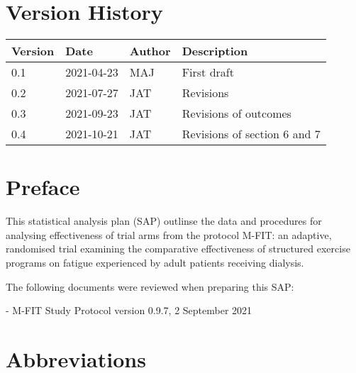 \documentclass[
]{article}
\title{\currentTitle}
\subtitle{}
\author{}
\date{\vspace{-2.5em}\currentVersion}
\begin{document}
\maketitle

{
  \setcounter{tocdepth}{2}
  \tableofcontents
}

\hypertarget{version-history}{%
  \section*{Version History}\label{version-history}}

\begin{table}[H]
  \renewcommand{\arraystretch}{1.5}
  \begin{center}
    \begin{tabular}{lllp{5cm}}
      \hline
      Version & Date       & Author & Description   \\ \hline
      0.1     & 2021-04-23 & MAJ    & First draft   \\
      0.2     & 2021-07-27 & JAT    & Revisions \\
      0.3     & 2021-09-23 & JAT    & Revisions of outcomes \\
      0.4     & 2021-10-21 & JAT    & Revisions of section 6 and 7 \\
      \hline
    \end{tabular}
  \end{center}
\end{table}

\clearpage

\hypertarget{preface}{%
  \section*{Preface}\label{Preface}}

This statistical analysis plan (SAP) outlinse the data and procedures for analysing effectiveness of trial arms from the protocol M-FIT: an adaptive, randomised trial examining the comparative effectiveness of structured exercise programs on fatigue experienced by adult patients receiving dialysis.

The following documents were reviewed when preparing this SAP:

- M-FIT Study Protocol version 0.9.7, 2 September 2021

\clearpage

\hypertarget{abbreviations}{%
  \section*{Abbreviations}\label{abbreviations}}
\end{document}
